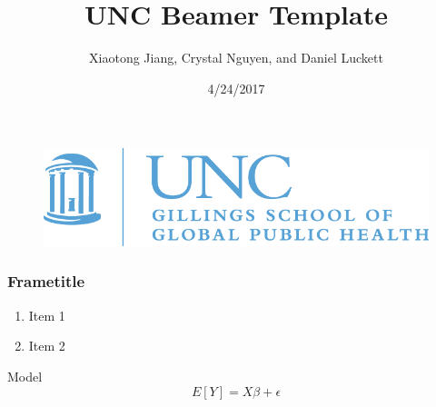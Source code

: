 \documentclass[xcolor=dvipsnames]{beamer}
\title[Template]{UNC Beamer Template}
\author[Jiang, Nguyen, Luckett]{Xiaotong Jiang, Crystal Nguyen, and Daniel Luckett}
\institute{UNC}
\date{4/24/2017}
\begin{document}
\begin{frame}
\titlepage
\begin{figure}
\begin{flushleft}
\includegraphics[scale=0.3]{unc_gillings_logo.png}
\end{flushleft}
\end{figure}
\end{frame}


\begin{frame}
\frametitle{Frametitle}
\begin{enumerate}
\item Item 1
\vfill
\item Item 2
\end{enumerate}
\vfill
\begin{block}{Model}
$$E[Y]=X\beta+\epsilon$$
\end{block}
\end{frame}
\end{document}

